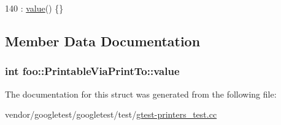 \begin{DoxyCode}
140 : \hyperlink{structfoo_1_1PrintableViaPrintTo_a16f8c6420275d86f0d0112ca5a41bca2}{value}() \{\}
\end{DoxyCode}


\subsection{Member Data Documentation}
\subsubsection[{\texorpdfstring{value}{value}}]{\setlength{\rightskip}{0pt plus 5cm}int foo\+::\+Printable\+Via\+Print\+To\+::value}\hypertarget{structfoo_1_1PrintableViaPrintTo_a16f8c6420275d86f0d0112ca5a41bca2}{}\label{structfoo_1_1PrintableViaPrintTo_a16f8c6420275d86f0d0112ca5a41bca2}


The documentation for this struct was generated from the following file\+:\begin{DoxyCompactItemize}
\item 
vendor/googletest/googletest/test/\hyperlink{gtest-printers__test_8cc}{gtest-\/printers\+\_\+test.\+cc}\end{DoxyCompactItemize}
